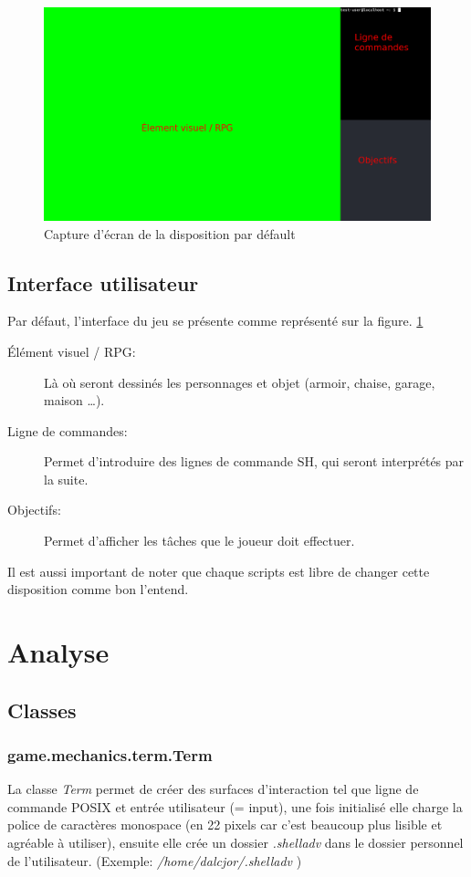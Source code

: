 \documentclass{report}
\begin{document}
\begin{figure}[hb!]
  \includegraphics[width=\linewidth]{img/image1}
  \caption{Capture d'écran de la disposition par défault}
  \label{fig:screen1}
\end{figure}
\section {Interface utilisateur}
Par défaut, l’interface du jeu se présente comme représenté sur la figure. \ref{fig:screen1}
\begin{description}
  \item [Élément visuel / RPG:] Là où seront dessinés les personnages et objet (armoir, chaise, garage, maison …).
  \item [Ligne de commandes:] Permet d’introduire des lignes de commande SH, qui seront interprétés par la suite.
  \item [Objectifs:] Permet d’afficher les tâches que le joueur doit effectuer.
\end{description}
\par Il est aussi important de noter que chaque scripts est libre de changer cette disposition comme bon l'entend.

\chapter{Analyse}
\section{Classes}
\subsection{game.mechanics.term.Term}
La classe \emph{Term} permet de créer des surfaces d'interaction tel que ligne de commande POSIX et entrée utilisateur (= input), une fois initialisé elle charge la police de caractères monospace (en 22 pixels car c’est beaucoup plus lisible et agréable à utiliser), ensuite elle crée un dossier \emph{.shelladv} dans le dossier personnel de l’utilisateur. (Exemple: \emph{/home/dalcjor/.shelladv} )
\end{document}
